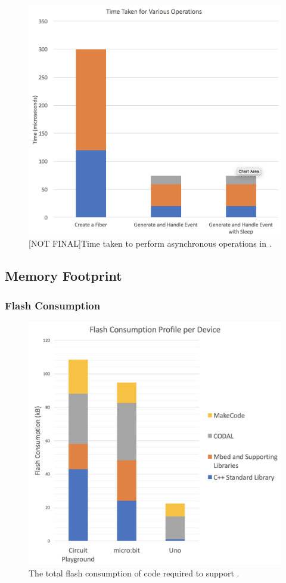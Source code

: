 \begin{figure}[ht]
    \includegraphics[width=.75\columnwidth]{images/time-taken.png}
\caption{\label{fig:time-taken}[NOT FINAL]Time taken to perform asynchronous operations in \CO.}
\end{figure}

\subsection{Memory Footprint}

\subsubsection{Flash Consumption}

\begin{figure}[ht]
    \includegraphics[width=.75\columnwidth]{./images/flash-consumption-per-device.png}
\caption{\label{fig:flash-consumption}The total flash consumption of code required to support \MC.}
\end{figure}

